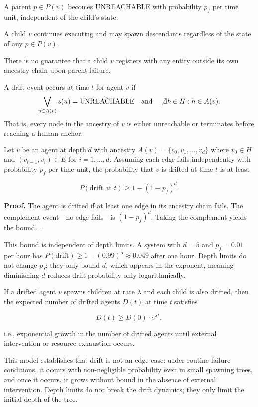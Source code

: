 \begin{axiom}
A parent $p \in P(v)$ becomes UNREACHABLE with probability $p_f$ per time unit,
independent of the child's state.
\end{axiom}

\begin{axiom}
A child $v$ continues executing and may spawn descendants regardless of the
state of any $p \in P(v)$.
\end{axiom}

\begin{axiom}
There is no guarantee that a child $v$ registers with any entity outside its own
ancestry chain upon parent failure.
\end{axiom}

\begin{definition}
A drift event occurs at time $t$ for agent $v$ if
\[
\bigvee_{u \in A(v)} s(u) = \text{UNREACHABLE}
\quad \text{and} \quad
\not\exists h \in H : h \in A(v) .
\]
That is, every node in the ancestry of $v$ is either unreachable or terminates
before reaching a human anchor.
\end{definition}

\begin{定理}
Let $v$ be an agent at depth $d$ with ancestry $A(v) = \{v_0, v_1, \dots, v_d\}$
where $v_0 \in H$ and $(v_{i-1}, v_i) \in E$ for $i = 1, \dots, d$. Assuming each
edge fails independently with probability $p_f$ per time unit, the probability
that $v$ is drifted at time $t$ is at least

\[
P(\text{drift at } t) \geq 1 - (1 - p_f)^{d} .
\]

\textbf{Proof.} The agent is drifted if at least one edge in its ancestry chain
fails. The complement event—no edge fails—is $(1 - p_f)^d$. Taking the
complement yields the bound. $\square$
\end{定理}

This bound is independent of depth limits. A system with $d=5$ and $p_f = 0.01$
per hour has $P(\text{drift}) \geq 1 - (0.99)^5 \approx 0.049$ after one hour.
Depth limits do not change $p_f$; they only bound $d$, which appears in the
exponent, meaning diminishing $d$ reduces drift probability only logarithmically.

\begin{conjecture}
If a drifted agent $v$ spawns children at rate $\lambda$ and each child is also
drifted, then the expected number of drifted agents $D(t)$ at time $t$ satisfies

\[
D(t) \geq D(0) \cdot e^{\lambda t} ,
\]

i.e., exponential growth in the number of drifted agents until external
intervention or resource exhaustion occurs.
\end{conjecture}

This model establishes that drift is not an edge case: under routine failure
conditions, it occurs with non-negligible probability even in small spawning
trees, and once it occurs, it grows without bound in the absence of external
intervention. Depth limits do not break the drift dynamics; they only limit the
initial depth of the tree.